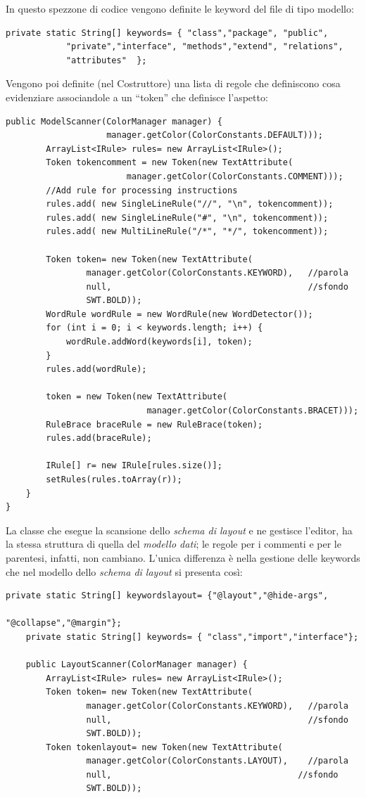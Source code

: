 In questo spezzone di codice vengono definite le keyword del file di tipo modello:
\begin{lstlisting}[caption={ModelScanner}, style={java}]
	private static String[] keywords= { "class","package", "public",
			"private","interface", "methods","extend", "relations", 
			"attributes"  };
\end{lstlisting}

Vengono poi definite (nel Costruttore) una lista di regole che definiscono cosa
evidenziare associandole a un ``token'' che definisce l'aspetto:

\begin{lstlisting}[caption={ModelScanner}, style={java}]
	public ModelScanner(ColorManager manager) {
					manager.getColor(ColorConstants.DEFAULT)));
		ArrayList<IRule> rules= new ArrayList<IRule>();	
		Token tokencomment = new Token(new TextAttribute(
						manager.getColor(ColorConstants.COMMENT)));
		//Add rule for processing instructions
		rules.add( new SingleLineRule("//", "\n", tokencomment));
		rules.add( new SingleLineRule("#", "\n", tokencomment));
		rules.add( new MultiLineRule("/*", "*/", tokencomment));
		
		Token token= new Token(new TextAttribute(
				manager.getColor(ColorConstants.KEYWORD), 	//parola
				null,                                       //sfondo
				SWT.BOLD));
		WordRule wordRule = new WordRule(new WordDetector());
		for (int i = 0; i < keywords.length; i++) {
			wordRule.addWord(keywords[i], token);
		}		
		rules.add(wordRule);
		
		token = new Token(new TextAttribute(
							manager.getColor(ColorConstants.BRACET)));
		RuleBrace braceRule = new RuleBrace(token);
		rules.add(braceRule);
		
		IRule[] r= new IRule[rules.size()];
		setRules(rules.toArray(r));
	}
}
\end{lstlisting}

La classe che esegue la scansione dello  \emph{schema di layout} e ne gestisce
l'editor, ha la stessa struttura di quella del \emph{modello dati}; le regole
per i commenti e per le parentesi, infatti, non cambiano. 
L'unica differenza è nella gestione delle keywords che nel modello dello
\emph{schema di layout} si presenta così:

\begin{lstlisting}[caption={LayoutScanner}, style={java}]
	private static String[] keywordslayout= {"@layout","@hide-args",
												"@collapse","@margin"};
	private static String[] keywords= { "class","import","interface"};
	
	public LayoutScanner(ColorManager manager) {
		ArrayList<IRule> rules= new ArrayList<IRule>();
		Token token= new Token(new TextAttribute(
				manager.getColor(ColorConstants.KEYWORD), 	//parola
				null,                                       //sfondo
				SWT.BOLD));
		Token tokenlayout= new Token(new TextAttribute(
				manager.getColor(ColorConstants.LAYOUT), 	//parola
				null,                                     //sfondo
				SWT.BOLD));
		
\end{lstlisting}

